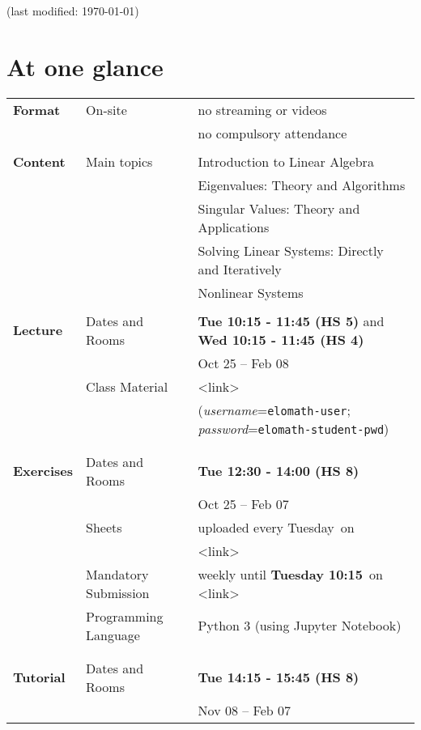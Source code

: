 \documentclass{article}
\title{{\Huge\bf \LectureName}}
\author{\Large \Lecturer}
\date{\Semester}
\def\classMaterial{<link>}
\def\lecturedates{{\color{blue} \bfseries Tue 10:15 - 11:45 (HS 5)} and  {\color{blue} \bfseries Wed 10:15 - 11:45  (HS 4)}}
\def\lecturePeriod{Oct 25 -- Feb 08}
\def\exercisedates{{\color{blue} \bfseries Tue 12:30 - 14:00 (HS 8)}}
\def\exercisePeriod{Oct 25 -- Feb 07}
\def\exercisedatesUploadday{Tuesday}
\def\deliveryDate{{\color{black} weekly until \bfseries Tuesday 10:15}}
\def\olatHomework{<link>}
\def\tutdates{{\color{blue} \bfseries Tue 14:15 - 15:45  (HS 8)}}
\def\tutPeriod{Nov 08 -- Feb 07}
\begin{document}
\maketitle
\begin{center}
{\color{blue}\small (last modified: \today)}
\end{center}
\setcounter{tocdepth}{1}
\tableofcontents
\newpage
\section{At one glance}\label{sec:AtOneGlance}
\begin{tabular}{lll}
%
\textbf{Format}	
&On-site& no streaming or videos \\
&& no compulsory attendance \\
&&\\
\textbf{Content} & Main topics & Introduction to Linear Algebra\\
&& Eigenvalues: Theory and Algorithms\\
&& Singular Values: Theory and Applications\\
&& Solving Linear Systems: Directly and Iteratively\\
&& Nonlinear Systems\\
&&\\
%
\textbf{Lecture} & Dates and Rooms  &\lecturedates\\
&& \lecturePeriod \\
 &Class Material & \classMaterial \\
&&(\textit{username}=\verb|elomath-user|; \textit{password}=\verb|elomath-student-pwd|)\\
&&\\
&&\\
\textbf{Exercises}
& Dates and Rooms &\exercisedates \\
&& \exercisePeriod \\
&Sheets& uploaded every \exercisedatesUploadday\ on\\
& & \classMaterial \\
&Mandatory Submission& \deliveryDate\ on \olatHomework\\
&Programming Language & Python 3 (using Jupyter Notebook)\\
&&\\
%
&&\\
\textbf{Tutorial}
& Dates and Rooms &\tutdates \\
&& \tutPeriod \\

\end{tabular}
\end{document}
